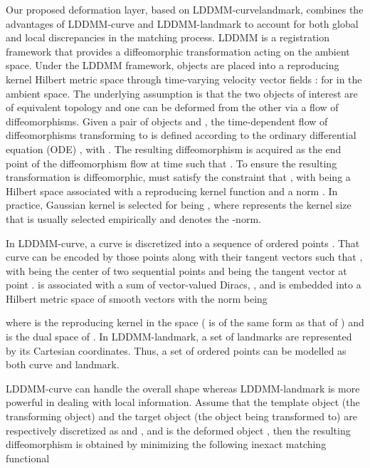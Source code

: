 \documentclass[10pt,twocolumn,letterpaper]{article}
\begin{document}
Our proposed deformation layer, based on LDDMM-curvelandmark, combines the advantages of LDDMM-curve \cite{glaunes2008large} and LDDMM-landmark \cite{joshi2000landmark} to account for both global and local discrepancies in the matching process. LDDMM \cite{glaunes2008large,joshi2000landmark,dupuis1998variational} is a registration framework that provides a diffeomorphic transformation acting on the ambient space. Under the LDDMM framework, objects are placed into a reproducing kernel Hilbert metric space through time-varying velocity vector fields :  for  in the ambient space. The underlying assumption is that the two objects of interest are of equivalent topology and one can be deformed from the other via a flow of diffeomorphisms. Given a pair of objects  and , the time-dependent flow of diffeomorphisms transforming  to  is defined according to the ordinary differential equation (ODE) , with . The resulting diffeomorphism  is acquired as the end point of the diffeomorphism flow at time  such that . To ensure the resulting transformation is diffeomorphic,  must satisfy the constraint that , with  being a Hilbert space associated with a reproducing kernel function  and a norm  \cite{trouve1995infinite}. In practice, Gaussian kernel is selected for  being
, where  represents the kernel size that is usually selected empirically and  denotes the -norm.

In LDDMM-curve, a curve  is discretized into a sequence of  ordered points . That curve can be encoded by those points along with their tangent vectors such that , with  being the center of two sequential points and  being the tangent vector at point .  is associated with a sum of vector-valued Diracs, , and is embedded into a Hilbert metric space  of smooth vectors with the norm being 


where  is the reproducing kernel in the space  ( is of the same form as that of ) and  is the dual space of . In LDDMM-landmark, a set of  landmarks  are represented by its Cartesian coordinates. Thus, a set of ordered points can be modelled as both curve and landmark. 

LDDMM-curve can handle the overall shape whereas LDDMM-landmark is more powerful in dealing with local information. Assume that the template object  (the transforming object) and the target object  (the object being transformed to) are respectively discretized as  and , and  is the deformed object , then the resulting diffeomorphism  is obtained by minimizing the following inexact matching functional
\end{document}
